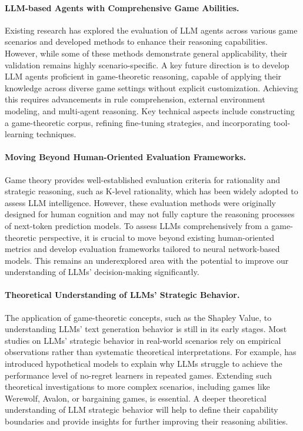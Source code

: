 \paragraph{LLM-based Agents with Comprehensive Game Abilities.} 
Existing research has explored the evaluation of LLM agents across various game scenarios and developed methods to enhance their reasoning capabilities. 
However, while some of these methods demonstrate general applicability, their validation remains highly scenario-specific.
A key future direction is to develop LLM agents proficient in game-theoretic reasoning, capable of applying their knowledge across diverse game settings without explicit customization. 
Achieving this requires advancements in rule comprehension, external environment modeling, and multi-agent reasoning.
Key technical aspects include constructing a game-theoretic corpus, refining fine-tuning strategies, and incorporating tool-learning techniques.


\paragraph{Moving Beyond Human-Oriented Evaluation Frameworks.}  
Game theory provides well-established evaluation criteria for rationality and strategic reasoning, such as K-level rationality, which has been widely adopted to assess LLM intelligence. However, these evaluation methods were originally designed for human cognition and may not fully capture the reasoning processes of next-token prediction models.
To assess LLMs comprehensively from a game-theoretic perspective, it is crucial to move beyond existing human-oriented metrics and develop evaluation frameworks tailored to neural network-based models. This remains an underexplored area with the potential to improve our understanding of LLMs' decision-making significantly.

\paragraph{Theoretical Understanding of LLMs' Strategic Behavior.}
The application of game-theoretic concepts, such as the Shapley Value, to understanding LLMs' text generation behavior is still in its early stages. Most studies on LLMs' strategic behavior in real-world scenarios rely on empirical observations rather than systematic theoretical interpretations.
For example, \cite{park2024llm} has introduced hypothetical models to explain why LLMs struggle to achieve the performance level of no-regret learners in repeated games. Extending such theoretical investigations to more complex scenarios, including games like Werewolf, Avalon, or bargaining games, is essential. A deeper theoretical understanding of LLM strategic behavior will help to define their capability boundaries and provide insights for further improving their reasoning abilities.

